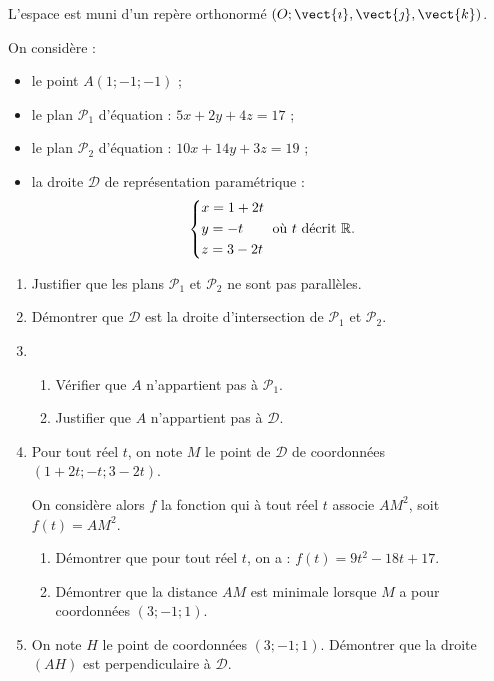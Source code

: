 L’espace est muni d’un repère orthonormé $(O;\vect{\imath},\vect{\jmath},\vect{k})$.

On considère :

\begin{itemize}
	\item le point $A(1;-1;-1)$ ;
	\item le plan $\mathcal{P}_1$ d’équation : $5x + 2y + 4z = 17$ ;
	\item le plan $\mathcal{P}_2$ d’équation : $10x + 14y + 3z = 19$ ;
	\item la droite $\mathcal{D}$ de représentation paramétrique : \[ \begin{dcases} x=1+2t \\ y=-t \\ z=3-2t \end{dcases} \text{ où } t \text{ décrit } \mathbb{R}.  \]
\end{itemize}

\begin{enumerate}
	\item Justifier que les plans $\mathcal{P}_1$ et $\mathcal{P}_2$ ne sont pas parallèles.
	\item Démontrer que $\mathcal{D}$ est la droite d’intersection de $\mathcal{P}_1$ et $\mathcal{P}_2$.
	\item 
	\begin{enumerate}
		\item Vérifier que $A$ n’appartient pas à $\mathcal{P}_1$.
		\item Justifier que $A$ n’appartient pas à $\mathcal{D}$.
	\end{enumerate}
	\item Pour tout réel $t$, on note $M$ le point de $\mathcal{D}$ de coordonnées $(1+2t;-t;3-2t)$.
	
	On considère alors $f$ la fonction qui à tout réel $t$ associe $AM^2$, soit $f(t)=AM^2$.
	\begin{enumerate}
		\item Démontrer que pour tout réel $t$, on a : $f(t)=9t^2-18t+17$.
		\item Démontrer que la distance $AM$ est minimale lorsque $M$ a pour coordonnées $(3;-1;1)$.
	\end{enumerate}
	\item On note $H$ le point de coordonnées $(3;-1;1)$. Démontrer que la droite $(AH)$ est perpendiculaire à $\mathcal{D}$.
\end{enumerate}
